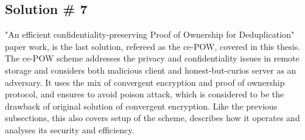 \documentclass[12pt]{article}
\begin{document}
 


\subsection{Solution \# 7}
\label{sub:Soltuion7}
"An efficient confidentiality-preserving Proof of Ownership for Deduplication" paper work\cite{ce-POW},  is the last solution, refereed as the ce-POW, covered in this thesis. The ce-POW scheme addresses the privacy and confidentiality issues in remote storage and considers both malicious client and honest-but-curios server as an adversary. It uses the mix of convergent encryption and proof of ownership protocol, and ensures to avoid poison attack, which is considered to be the drawback of original solution of convergent encryption. Like the previous subsections, this also  covers setup of the scheme, describes how it operates and analyses its security and efficiency. 
\end{document}
